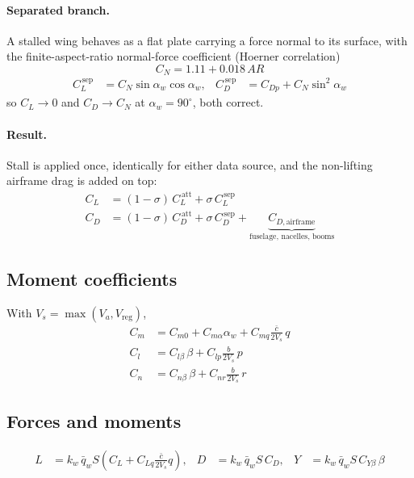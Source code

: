 \documentclass[11pt,a4paper]{article}
\begin{document}
\paragraph{Separated branch.} A stalled wing behaves as a flat plate carrying a
force normal to its surface, with the finite-aspect-ratio normal-force
coefficient (Hoerner correlation)
\begin{equation}
C_N=1.11+0.018\,A\!R
\end{equation}
\begin{align}
C_{L}^{\,\mathrm{sep}}&=C_N\sin\alpha_w\cos\alpha_w, &
C_{D}^{\,\mathrm{sep}}&=C_{Dp}+C_N\sin^{2}\alpha_w
\end{align}
so $C_L\to0$ and $C_D\to C_N$ at $\alpha_w=90^\circ$, both correct.

\paragraph{Result.} Stall is applied once, identically for either data source,
and the non-lifting airframe drag is added on top:
\begin{align}
C_L&=(1-\sigma)\,C_{L}^{\,\mathrm{att}}+\sigma\,C_{L}^{\,\mathrm{sep}}\\
C_D&=(1-\sigma)\,C_{D}^{\,\mathrm{att}}+\sigma\,C_{D}^{\,\mathrm{sep}}
+\underbrace{C_{D,\mathrm{airframe}}}_{\text{fuselage, nacelles, booms}}
\end{align}

\subsection{Moment coefficients}
With $V_s=\max(V_a,V_{\!\mathrm{reg}})$,
\begin{align}
C_m&=C_{m0}+C_{m\alpha}\alpha_w+C_{mq}\frac{\bar c}{2V_s}\,q\\
C_l&=C_{l\beta}\,\beta+C_{lp}\frac{b}{2V_s}\,p\\
C_n&=C_{n\beta}\,\beta+C_{nr}\frac{b}{2V_s}\,r
\end{align}

\subsection{Forces and moments}
\begin{align}
L&=k_w\,\bar q_w S\left(C_L+C_{Lq}\frac{\bar c}{2V_s}q\right), &
D&=k_w\,\bar q_w S\,C_D, &
Y&=k_w\,\bar q_w S\,C_{Y\beta}\,\beta
\end{align}
\end{document}
